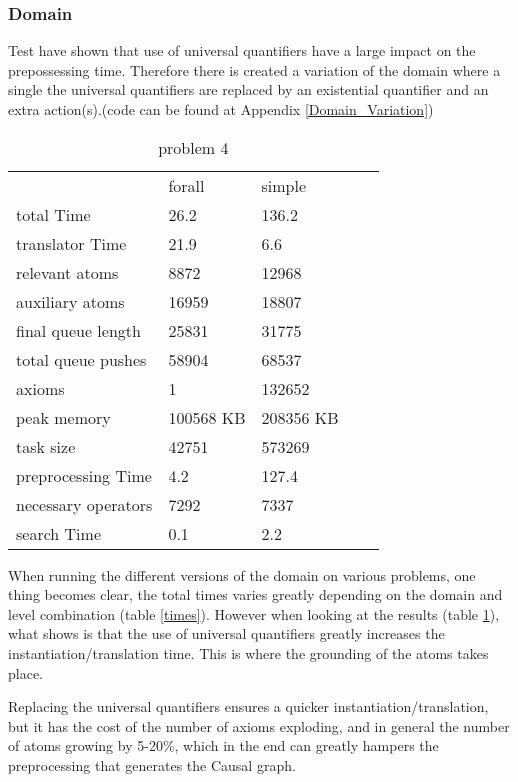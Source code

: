 	\subsubsection{Domain}
	Test have shown that use of universal quantifiers have a large impact on the prepossessing time. Therefore there is created a variation of the domain where a single the universal quantifiers are replaced by an existential quantifier and an extra action(s).(code can be found at Appendix \ref{Domain_Variation})
	
	\begin{table}[h]
		\centering
		\caption{problem 4}
		\label{prob4}
		\begin{tabular}{lllll}
			& forall & simple  \\
			total Time & 26.2 & 136.2 \\
			translator Time& 21.9 & 6.6 \\
			
			
			relevant atoms & 8872 & 12968\\
			auxiliary atoms & 16959& 18807\\
			final queue length &25831 & 31775\\
			total queue pushes &58904 & 68537\\
			axioms & 1 & 132652 \\ 
			peak memory & 100568 KB & 208356 KB\\ 
			task size & 42751 & 573269\\
				
				
			preprocessing Time& 4.2 & 127.4 \\
			necessary operators & 7292 & 7337\\
				
				
			search Time & 0.1 & 2.2 \\
		\end{tabular}
	\end{table}
	When running the different versions of the domain on various problems, one thing becomes clear, the total times varies greatly depending on the domain and level combination (table \ref{times}). However when looking at the results (table \ref{prob4}), what shows is that the use of universal quantifiers greatly increases the instantiation/translation time. This is where the grounding of the atoms takes place.
	
	Replacing the universal quantifiers ensures a quicker instantiation/translation, but it has the cost of the number of axioms exploding, and in general the number of atoms growing by 5-20\%, which in the end can greatly hampers the preprocessing that generates the Causal graph.
	
